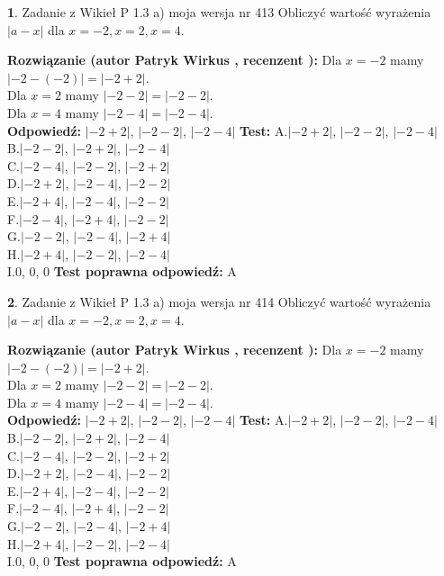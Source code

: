 \documentclass[12pt, a4paper]{article}
\theoremstyle{definition} %
\newtheorem{zad}{}
\newcommand{\zadStart}[1]{\begin{zad}#1\newline}
\newcommand{\zadStop}{\end{zad}}
\newcommand{\rozwStart}[2]{\noindent \textbf{Rozwiązanie (autor #1 , recenzent #2): }\newline}
\newcommand{\rozwStop}{\newline}
\newcommand{\odpStart}{\noindent \textbf{Odpowiedź:}\newline}
\newcommand{\odpStop}{\newline}
\newcommand{\testStart}{\noindent \textbf{Test:}\newline}
\newcommand{\testStop}{\newline}
\newcommand{\kluczStart}{\noindent \textbf{Test poprawna odpowiedź:}\newline}
\newcommand{\kluczStop}{\newline}
\begin{document}
\zadStart{Zadanie z Wikieł P 1.3 a) moja wersja nr 413}
Obliczyć wartość wyrażenia $|a - x|$ dla $x=-2,x=2,x=4$.
\zadStop
\rozwStart{Patryk Wirkus}{}
Dla $x = -2$ mamy $|-2 - (-2)| = |-2 + 2|$.\\
Dla $x = 2$ mamy $|-2 - 2| = |-2 - 2|$.\\
Dla $x = 4$ mamy $|-2 - 4| = |-2 - 4|$.\\
\rozwStop
\odpStart
$|-2 + 2|$, $|-2 - 2|$, $|-2 - 4|$
\odpStop
\testStart
A.$|-2 + 2|$, $|-2 - 2|$, $|-2 - 4|$\\
B.$|-2 - 2|$, $|-2 + 2|$, $|-2 - 4|$\\
C.$|-2 - 4|$, $|-2 - 2|$, $|-2 + 2|$\\
D.$|-2 + 2|$, $|-2 - 4|$, $|-2 - 2|$\\
E.$|-2 + 4|$, $|-2 - 4|$, $|-2 - 2|$\\
F.$|-2 - 4|$, $|-2 + 4|$, $|-2 - 2|$\\
G.$|-2 - 2|$, $|-2 - 4|$, $|-2 + 4|$\\
H.$|-2 + 4|$, $|-2 - 2|$, $|-2 - 4|$\\
I.$0$, $0$, $0$
\testStop
\kluczStart
A
\kluczStop



\zadStart{Zadanie z Wikieł P 1.3 a) moja wersja nr 414}
Obliczyć wartość wyrażenia $|a - x|$ dla $x=-2,x=2,x=4$.
\zadStop
\rozwStart{Patryk Wirkus}{}
Dla $x = -2$ mamy $|-2 - (-2)| = |-2 + 2|$.\\
Dla $x = 2$ mamy $|-2 - 2| = |-2 - 2|$.\\
Dla $x = 4$ mamy $|-2 - 4| = |-2 - 4|$.\\
\rozwStop
\odpStart
$|-2 + 2|$, $|-2 - 2|$, $|-2 - 4|$
\odpStop
\testStart
A.$|-2 + 2|$, $|-2 - 2|$, $|-2 - 4|$\\
B.$|-2 - 2|$, $|-2 + 2|$, $|-2 - 4|$\\
C.$|-2 - 4|$, $|-2 - 2|$, $|-2 + 2|$\\
D.$|-2 + 2|$, $|-2 - 4|$, $|-2 - 2|$\\
E.$|-2 + 4|$, $|-2 - 4|$, $|-2 - 2|$\\
F.$|-2 - 4|$, $|-2 + 4|$, $|-2 - 2|$\\
G.$|-2 - 2|$, $|-2 - 4|$, $|-2 + 4|$\\
H.$|-2 + 4|$, $|-2 - 2|$, $|-2 - 4|$\\
I.$0$, $0$, $0$
\testStop
\kluczStart
A
\kluczStop
\end{document}
